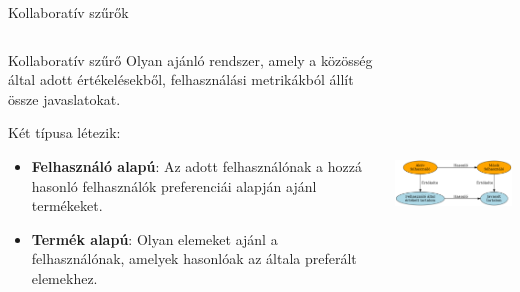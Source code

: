 \documentclass[english, aspectratio=169]{beamer}
\begin{document}
\begin{frame}{Kollaboratív szűrők}
\begin{columns}
\begin{column}{.5\textwidth}
\begin{block}{Kollaboratív szűrő}
Olyan ajánló rendszer, amely a közösség által adott értékelésekből, felhasználási metrikákból állít össze javaslatokat.
\end{block}
Két típusa létezik:
\begin{itemize}
	\item \textbf{Felhasználó alapú}: Az adott felhasználónak a hozzá hasonló felhasználók preferenciái alapján ajánl termékeket.
	\item \textbf{Termék alapú}: Olyan elemeket ajánl a felhasználónak, amelyek hasonlóak az általa preferált elemekhez.
\end{itemize}
\end{column}
\begin{column}{.5\textwidth}
\begin{center}
\includegraphics[width=7cm, height=7cm, keepaspectratio]{graphs/recommender_4.png}
\end{center}
\end{column}
\end{columns}
\end{frame}
\end{document}
